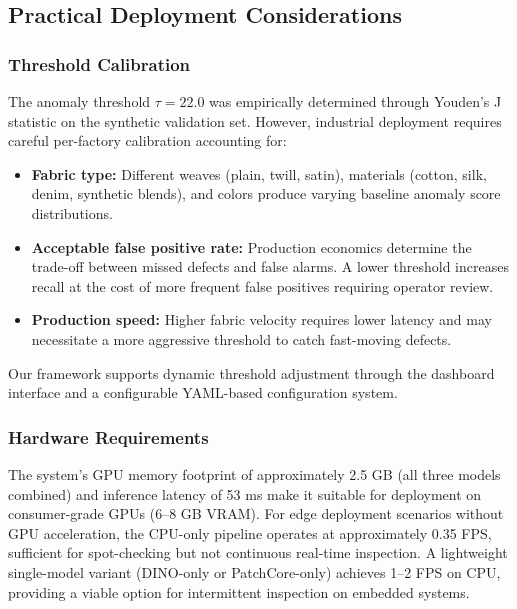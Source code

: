 \documentclass[journal]{IEEEtran}
\begin{document}
\subsection{Practical Deployment Considerations}

\subsubsection{Threshold Calibration}

The anomaly threshold $\tau = 22.0$ was empirically determined through Youden's J statistic on the synthetic validation set. However, industrial deployment requires careful per-factory calibration accounting for:

\begin{itemize}[nosep]
    \item \textbf{Fabric type:} Different weaves (plain, twill, satin), materials (cotton, silk, denim, synthetic blends), and colors produce varying baseline anomaly score distributions.
    \item \textbf{Acceptable false positive rate:} Production economics determine the trade-off between missed defects and false alarms. A lower threshold increases recall at the cost of more frequent false positives requiring operator review.
    \item \textbf{Production speed:} Higher fabric velocity requires lower latency and may necessitate a more aggressive threshold to catch fast-moving defects.
\end{itemize}

Our framework supports dynamic threshold adjustment through the dashboard interface and a configurable YAML-based configuration system.

\subsubsection{Hardware Requirements}

The system's GPU memory footprint of approximately 2.5 GB (all three models combined) and inference latency of 53 ms make it suitable for deployment on consumer-grade GPUs (6--8 GB VRAM). For edge deployment scenarios without GPU acceleration, the CPU-only pipeline operates at approximately 0.35 FPS, sufficient for spot-checking but not continuous real-time inspection. A lightweight single-model variant (DINO-only or PatchCore-only) achieves 1--2 FPS on CPU, providing a viable option for intermittent inspection on embedded systems.
\end{document}
